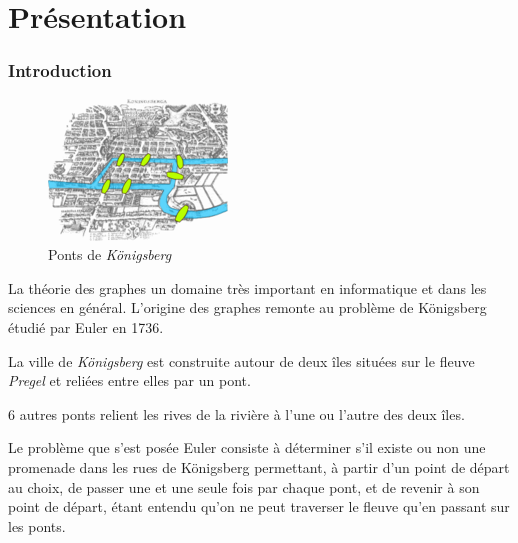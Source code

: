 

\section{Présentation} 

\begin{frame}[fragile]
\frametitle{Introduction}

\begin{figure}
\vspace{-0.5cm}
  \begin{center}
    \includegraphics[width=0.9\linewidth]{img/Konigsberg_bridges}
  \end{center}
  \caption{Ponts de \textit{Königsberg}}
\end{figure}

La théorie des graphes un domaine très important en informatique et dans les sciences en général. L'origine des graphes remonte au problème de Königsberg étudié par Euler en 1736.

La ville de \textit{Königsberg} est construite autour de deux îles situées sur le fleuve \textit{Pregel} et reliées entre elles par un pont.

6 autres ponts relient les rives de la rivière à l'une ou l'autre des deux îles.

Le problème que s'est posée Euler consiste à déterminer
 s'il existe ou non une promenade dans les rues de Königsberg permettant, à partir d'un point de départ au choix, de passer une et une seule fois par chaque pont, et de revenir à son point de départ, étant entendu qu'on ne peut traverser le fleuve qu'en passant sur les ponts.
\end{frame}

